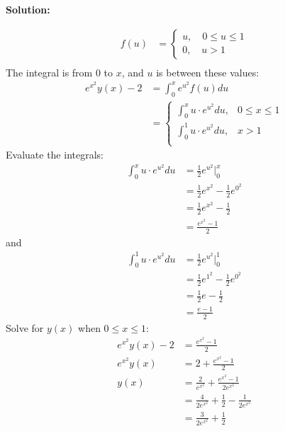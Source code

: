 \documentclass[12pt]{article}
\newenvironment{solution}{
    \textbf{Solution:}
    
}{
    
    \vspace{2em}
}
\begin{document}
\begin{solution}
\[\begin{aligned}
                f(u) &= \begin{cases}
                u, \quad 0\leq u\leq 1\\
                0, \quad u>1
                \end{cases}\\
        \end{aligned}
    \]
The integral is from \(0\) to \(x\), and \(u\) is between these values:
    \[
        \begin{aligned}
            e^{x^2}y(x)- 2 &= \int_{0}^x e^{u^2} f(u)du\\
            &= \begin{cases}
                \int_{0}^x u \cdot e^{u^2}  du, & 0\leq x\leq 1\\[0.5em]
                \int_{0}^1 u \cdot e^{u^2}  du, & x>1\\[0.5em]
            \end{cases}
        \end{aligned}
    \]
Evaluate the integrals:
    \[
        \begin{aligned}
            \int_{0}^x u \cdot e^{u^2}  du &= \frac{1}{2} e^{u^2}\Big|_{0}^x\\
            &= \frac{1}{2} e^{x^2}-\frac{1}{2} e^{0^2}\\
            &= \frac{1}{2} e^{x^2}-\frac{1}{2}\\
            &= \frac{e^{x^2}-1}{2}
        \end{aligned}
    \]
    and
    \[
        \begin{aligned}
            \int_{0}^1 u \cdot e^{u^2}  du &= \frac{1}{2} e^{u^2}\Big|_{0}^1\\
            &= \frac{1}{2} e^{1^2}-\frac{1}{2} e^{0^2}\\
            &= \frac{1}{2} e - \frac{1}{2}\\
            &= \frac{e-1}{2}
        \end{aligned}
    \]
Solve for \(y(x)\) when \(0\leq x\leq 1\):
    \[
        \begin{aligned}
            e^{x^2}y(x)- 2 &= \frac{e^{x^2}-1}{2}\\
            e^{x^2}y(x) &= 2 + \frac{e^{x^2}-1}{2}\\
            y(x) &= \frac{2}{e^{x^2}} + \frac{e^{x^2}-1}{2e^{x^2}}\\
            &= \frac{4}{2e^{x^2}} + \frac{1}{2} - \frac{1}{2e^{x^2}}\\
            &= \frac{3}{2e^{x^2}} + \frac{1}{2}
        \end{aligned}
\]
\end{solution}
\end{document}
